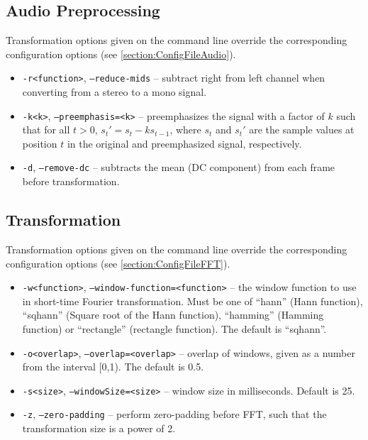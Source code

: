 \subsection{Audio Preprocessing}

Transformation options given on the command line override the corresponding 
configuration options (see \ref{section:ConfigFileAudio}).

\begin{itemize}
  \item {\tt -r<function>}, {\tt --reduce-mids} -- subtract right from left
    channel when converting from a stereo to a mono signal.
  \item {\tt -k<k>}, {\tt --preemphasis=<k>} -- preemphasizes the signal with
    a factor of $k$ such that for all $t > 0$, $s_t' = s_t - ks_{t-1}$, where
    $s_t$ and $s_t'$ are the sample values at position $t$ in the original and
    preemphasized signal, respectively.
  \item {\tt -d}, {\tt --remove-dc} -- subtracts the mean (DC component) from
    each frame before transformation.
\end{itemize}

\subsection{Transformation}

Transformation options given on the command line override the corresponding 
configuration options (see \ref{section:ConfigFileFFT}).

\begin{itemize}
  \item {\tt -w<function>}, {\tt --window-function=<function>} -- the window
    function to use in short-time Fourier transformation. Must be one of
    ``hann'' (Hann function), ``sqhann'' (Square root of the Hann
    function), ``hamming'' (Hamming function) or ``rectangle'' (rectangle
    function). The default is ``sqhann''.
  \item {\tt -o<overlap>}, {\tt --overlap=<overlap>} -- overlap of windows,
    given as a number from the interval [0,1). The default is 0.5.
  \item {\tt -s<size>}, {\tt --windowSize=<size>} -- window size in
    milliseconds. Default is 25.
  \item {\tt -z}, {\tt --zero-padding} -- perform zero-padding before FFT,
    such that the transformation size is a power of 2.
\end{itemize}

